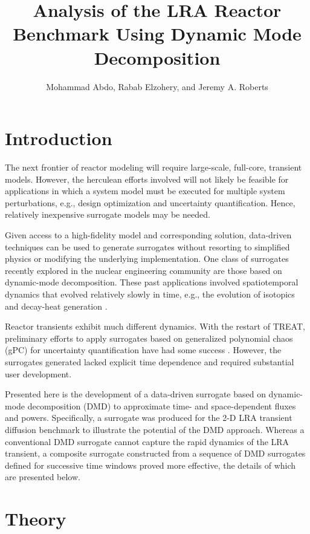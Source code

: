 \documentclass{anstrans}
\title{Analysis of the LRA Reactor Benchmark Using Dynamic Mode Decomposition}
\author{Mohammad Abdo, Rabab Elzohery, and Jeremy A. Roberts}
\institute{
Department of Mechanical \& Nuclear Engineering, Kansas State University, Manhattan, KS 66506
}
\begin{document}
\section{Introduction}

The next frontier of reactor modeling will require large-scale, full-core, transient models.
However, the herculean efforts involved will not likely be feasible for applications in which a system model must be executed for multiple system perturbations, e.g., design optimization and uncertainty quantification.
Hence, relatively  inexpensive surrogate models may be needed.

Given access to a high-fidelity model and corresponding solution, data-driven techniques can be used to generate surrogates without resorting to simplified physics or modifying the underlying implementation.  
One class of surrogates recently explored in the nuclear engineering community are those based on dynamic-mode decomposition.  
These past applications involved spatiotemporal dynamics that evolved relatively slowly in time, e.g., the evolution of isotopics \cite{abdo2018data, elzohery2018cbg} and decay-heat generation \cite{alfonsi2018dhc}.

Reactor transients exhibit much different dynamics.
With the restart of TREAT, preliminary efforts to apply surrogates based on generalized polynomial chaos (gPC) for uncertainty quantification have had some success \cite{wang2017usa}.
However, the surrogates generated lacked explicit time dependence and required substantial user development.

Presented here is the development of a data-driven surrogate based on dynamic-mode decomposition (DMD) to approximate time- and space-dependent fluxes and powers.
Specifically, a surrogate was produced for the 2-D LRA transient diffusion benchmark to illustrate the potential of the DMD approach. 
Whereas a conventional DMD surrogate cannot capture the rapid dynamics of the LRA transient, a composite surrogate constructed from a sequence of DMD surrogates defined for successive time windows proved more effective, the details of which are presented below.


\section{Theory}
\label{sec:backgound}
\end{document}
